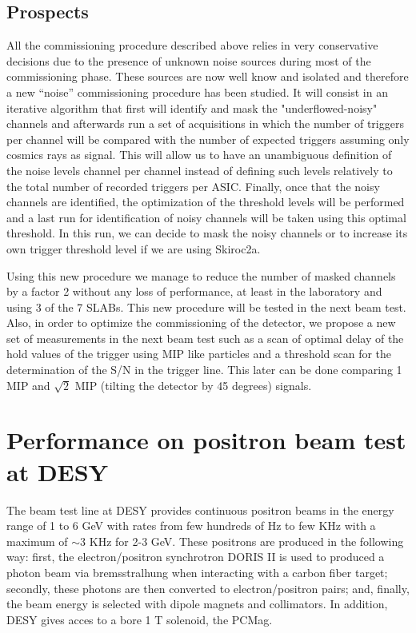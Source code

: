 \documentclass[a4paper,11pt]{article}
\begin{document}
\subsection{Prospects}
\label{sec:comm_prospects}

All the commissioning procedure described above relies in very conservative decisions
due to the presence of unknown noise sources during most of the commissioning phase. These sources are
now well know and isolated and therefore a new ``noise'' commissioning procedure has been studied.
It will consist in an iterative algorithm that first
will identify and mask the "underflowed-noisy" channels and afterwards run a set of acquisitions
in which the number of triggers per channel will be compared with the number of expected triggers
assuming only cosmics rays as signal. This will allow us to have an
unambiguous definition of the noise levels channel per channel instead of 
defining such levels relatively to the total number
of recorded triggers per ASIC. Finally, once that the noisy channels
are identified, the optimization of the threshold levels
will be performed and a last run for identification of noisy channels will be taken using this optimal
threshold. In this run, we can decide to mask the noisy channels or
to increase its own trigger threshold level if we are using Skiroc2a.

Using this new procedure we manage to reduce the number of masked channels by a factor 2 without any loss of performance,
at least in the laboratory and using 3 of the 7 SLABs. This new procedure will be tested in the next beam test.
Also, in order to
optimize the commissioning of the detector,
we propose a new set of measurements in the next beam test such as
a scan of optimal delay of the hold values of the trigger using MIP like particles
and a threshold scan for the determination of the S/N in the trigger line. This later
can be done comparing 1 MIP and $\sqrt{2}$ MIP (tilting the detector by 45 degrees) signals.


\section{Performance on positron beam test at DESY}
\label{sec:beamtest}


The beam test line at DESY provides continuous positron beams in the energy range of 1 to 6 GeV with
rates from few hundreds of Hz to few KHz with a maximum of $\sim 3$ KHz for 2-3 GeV. 
These positrons are produced in the following way: first, the electron/positron synchrotron DORIS II 
is used to produced a photon beam via bremsstralhung when interacting with a carbon fiber target;
secondly, these photons are then converted to electron/positron pairs; 
and, finally, the beam energy is selected with dipole magnets and collimators. 
In addition, DESY gives acces to a bore 1 T solenoid, the PCMag.
\end{document}
